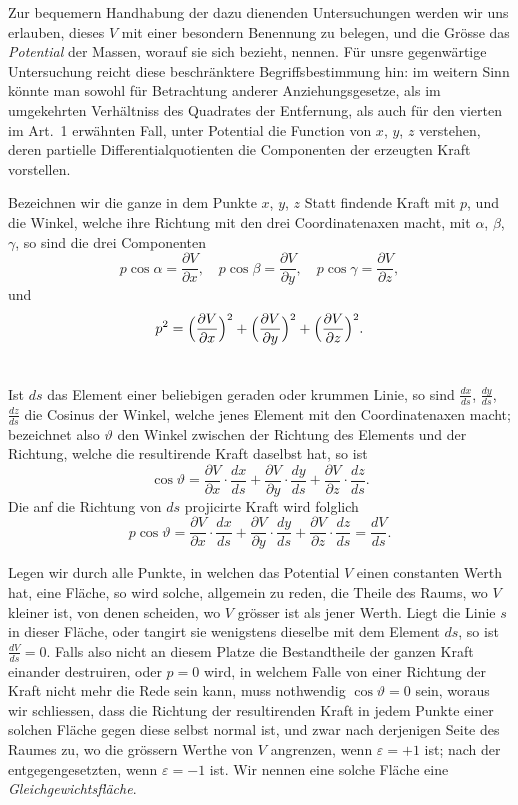 \documentclass[12pt,a4paper]{article}
\begin{document}
Zur bequemern Handhabung der dazu dienenden Untersuchungen werden
wir uns erlauben, dieses $V$ mit einer besondern Benennung zu belegen, und
die Grösse das \emph{Potential} der Massen, worauf sie sich bezieht, nennen. Für unsre
gegenwärtige Untersuchung reicht diese beschränktere Begriffsbestimmung hin:
im weitern Sinn könnte man sowohl für Betrachtung anderer Anziehungsgesetze,
als im umgekehrten Verhältniss des Quadrates der Entfernung, als auch für den
vierten im Art.~1 erwähnten Fall, unter Potential die Function von $x$, $y$, $z$ verstehen,
deren partielle Differentialquotienten die Componenten der erzeugten
Kraft vorstellen.

Bezeichnen wir die ganze in dem Punkte $x$, $y$, $z$ Statt findende Kraft mit
$p$, und die Winkel, welche ihre Richtung mit den drei Coordinatenaxen macht,
mit $\alpha$, $\beta$, $\gamma$, so sind die drei Componenten
\[
p\cos\alpha = \frac{\partial V}{\partial x},\quad
p\cos\beta = \frac{\partial V}{\partial y},\quad
p\cos\gamma = \frac{\partial V}{\partial z},
\]
und
\[
p^2 = \Bigl(\frac{\partial V}{\partial x}\Bigr)^2
     + \Bigl(\frac{\partial V}{\partial y}\Bigr)^2
     + \Bigl(\frac{\partial V}{\partial z}\Bigr)^2.
\]

\section{}
Ist $ds$ das Element einer beliebigen geraden oder krummen Linie, so sind
$\tfrac{dx}{ds}$, $\tfrac{dy}{ds}$, $\tfrac{dz}{ds}$ die Cosinus der Winkel, welche jenes Element mit den Coordinatenaxen
macht; bezeichnet also $\vartheta$ den Winkel zwischen der Richtung des Elements
und der Richtung, welche die resultirende Kraft daselbst hat, so ist
\[
\cos\vartheta = \frac{\partial V}{\partial x}\cdot\frac{dx}{ds}
            + \frac{\partial V}{\partial y}\cdot\frac{dy}{ds}
            + \frac{\partial V}{\partial z}\cdot\frac{dz}{ds}.
\]
Die anf die Richtung von $ds$ projicirte Kraft wird folglich
\[
p\cos\vartheta = \frac{\partial V}{\partial x}\cdot\frac{dx}{ds}
               + \frac{\partial V}{\partial y}\cdot\frac{dy}{ds}
               + \frac{\partial V}{\partial z}\cdot\frac{dz}{ds}
             = \frac{dV}{ds}.
\]

Legen wir durch alle Punkte, in welchen das Potential $V$ einen constanten
Werth hat, eine Fläche, so wird solche, allgemein zu reden, die Theile des
Raums, wo $V$ kleiner ist, von denen scheiden, wo $V$ grösser ist als jener Werth.
Liegt die Linie $s$ in dieser Fläche, oder tangirt sie wenigstens dieselbe mit dem
Element $ds$, so ist $\frac{dV}{ds}=0$. Falls also nicht an diesem Platze die Bestandtheile
der ganzen Kraft einander destruiren, oder $p=0$ wird, in welchem Falle von
einer Richtung der Kraft nicht mehr die Rede sein kann, muss nothwendig
$\cos\vartheta=0$ sein, woraus wir schliessen, dass die Richtung der resultirenden Kraft
in jedem Punkte einer solchen Fläche gegen diese selbst normal ist, und zwar
nach derjenigen Seite des Raumes zu, wo die grössern Werthe von $V$ angrenzen,
wenn $\varepsilon=+1$ ist; nach der entgegengesetzten, wenn $\varepsilon=-1$ ist. Wir nennen
eine solche Fläche eine \emph{Gleichgewichtsfläche}.
\end{document}
